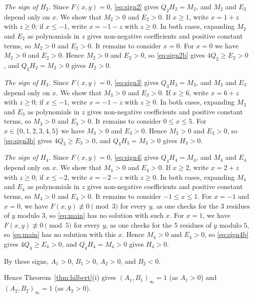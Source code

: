 \documentclass[11pt]{article}
\begin{document}
\emph{The sign of $H_{2}$.} Since $F(x,y)=0$, \eqref{eq:sign2} gives $Q_{2}H_{2}=M_{2}$, and $M_{2}$ and $E_{2}$ depend only on $x$. We show that $M_{2}>0$ and $E_{2}>0$. If $x\geq1$, write $x=1+z$ with $z\geq0$; if $x\leq-1$, write $x=-1-z$ with $z\geq0$. In both cases, expanding $M_{2}$ and $E_{2}$ as polynomials in $z$ gives non-negative coefficients and positive constant terms, so $M_{2}>0$ and $E_{2}>0$. It remains to consider $x=0$. For $x=0$ we have $M_{2}>0$ and $E_{2}>0$. Hence $M_{2}>0$ and $E_{2}>0$, so \eqref{eq:sign2b} gives $4Q_{2}\geq E_{2}>0$, and $Q_{2}H_{2}=M_{2}>0$ gives $H_{2}>0$.

\emph{The sign of $H_{3}$.} Since $F(x,y)=0$, \eqref{eq:sign3} gives $Q_{3}H_{3}=M_{3}$, and $M_{3}$ and $E_{3}$ depend only on $x$. We show that $M_{3}>0$ and $E_{3}>0$. If $x\geq6$, write $x=6+z$ with $z\geq0$; if $x\leq-1$, write $x=-1-z$ with $z\geq0$. In both cases, expanding $M_{3}$ and $E_{3}$ as polynomials in $z$ gives non-negative coefficients and positive constant terms, so $M_{3}>0$ and $E_{3}>0$. It remains to consider $0\leq x\leq5$. For $x\in\{0,\allowbreak 1,\allowbreak 2,\allowbreak 3,\allowbreak 4,\allowbreak 5\}$ we have $M_{3}>0$ and $E_{3}>0$. Hence $M_{3}>0$ and $E_{3}>0$, so \eqref{eq:sign3b} gives $4Q_{3}\geq E_{3}>0$, and $Q_{3}H_{3}=M_{3}>0$ gives $H_{3}>0$.

\emph{The sign of $H_{4}$.} Since $F(x,y)=0$, \eqref{eq:sign4} gives $Q_{4}H_{4}=M_{4}$, and $M_{4}$ and $E_{4}$ depend only on $x$. We show that $M_{4}>0$ and $E_{4}>0$. If $x\geq2$, write $x=2+z$ with $z\geq0$; if $x\leq-2$, write $x=-2-z$ with $z\geq0$. In both cases, expanding $M_{4}$ and $E_{4}$ as polynomials in $z$ gives non-negative coefficients and positive constant terms, so $M_{4}>0$ and $E_{4}>0$. It remains to consider $-1\leq x\leq1$. For $x=-1$ and $x=0$, we have $F(x,y)\not\equiv0\pmod{3}$ for every $y$, as one checks for the 3 residues of $y$ modulo $3$, so \eqref{eq:main} has no solution with such $x$. For $x=1$, we have $F(x,y)\not\equiv0\pmod{5}$ for every $y$, as one checks for the 5 residues of $y$ modulo $5$, so \eqref{eq:main} has no solution with this $x$. Hence $M_{4}>0$ and $E_{4}>0$, so \eqref{eq:sign4b} gives $4Q_{4}\geq E_{4}>0$, and $Q_{4}H_{4}=M_{4}>0$ gives $H_{4}>0$.

By these signs, $A_{1}>0$, $B_{1}>0$, $A_{2}>0$, and $B_{2}<0$.

Hence Theorem~\ref{thm:hilbert}(i) gives $(A_{1},B_{1})_\infty=1$ (as $A_{1}>0$) and $(A_{2},B_{2})_\infty=1$ (as $A_{2}>0$).
\end{document}
